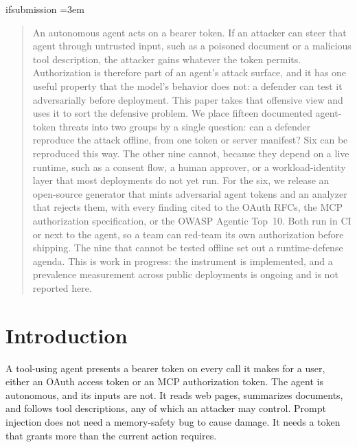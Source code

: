 \ifdefined\ifsubmission\else\expandafter\newif\csname ifsubmission\endcsname\submissiontrue\fi
\providecommand{\gate}[1]{\ifsubmission #1\else \textbf{[PENDING: #1]}\fi}
\providecommand{\draftonly}[1]{\ifsubmission\else \textbf{[NOTE: #1]}\fi}
\providecommand{\yes}{\ensuremath{\surd}}
\providecommand{\no}{\ensuremath{\times}}
\emergencystretch=3em

\begin{abstract}
An autonomous agent acts on a bearer token. If an attacker can steer that agent
through untrusted input, such as a poisoned document or a malicious tool
description, the attacker gains whatever the token permits. Authorization is
therefore part of an agent's attack surface, and it has one useful property that the
model's behavior does not: a defender can test it adversarially before deployment.
This paper takes that offensive view and uses it to sort the defensive problem. We
place fifteen documented agent-token threats into two groups by a single question:
can a defender reproduce the attack offline, from one token or server manifest? Six
can be reproduced this way. The other nine cannot, because they depend on a live
runtime, such as a consent flow, a human approver, or a workload-identity layer that
most deployments do not yet run. For the six, we release an open-source generator
that mints adversarial agent tokens and an analyzer that rejects them, with every
finding cited to the OAuth RFCs, the MCP authorization specification, or the OWASP
Agentic Top~10. Both run in CI or next to the agent, so a team can red-team its own
authorization before shipping. The nine that cannot be tested offline set out a
runtime-defense agenda. This is work in progress: the instrument is implemented, and
a prevalence measurement across public deployments is ongoing and is not reported
here.
\end{abstract}

\section{Introduction}
A tool-using agent presents a bearer token on every call it makes for a user, either
an OAuth access token or an MCP authorization token. The agent is autonomous, and its
inputs are not. It reads web pages, summarizes documents, and follows tool
descriptions, any of which an attacker may control. Prompt injection does not need a
memory-safety bug to cause damage. It needs a token that grants more than the current
action requires.

